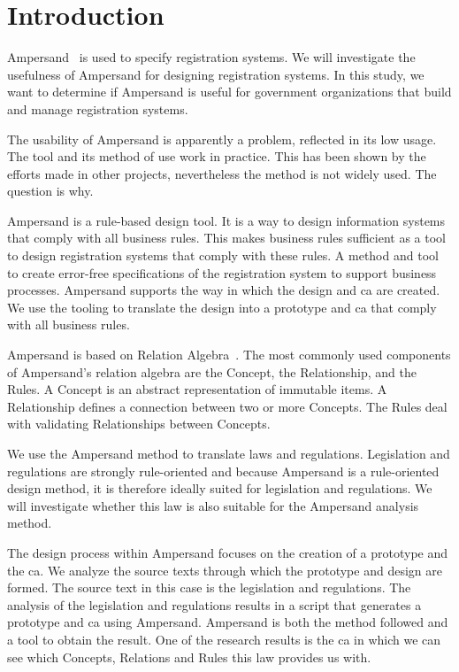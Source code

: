\newpage
\section{Introduction} \label{Introduction}
Ampersand~\citep{joosten_software_2017} is used to specify registration systems.
We will investigate the usefulness of Ampersand for designing registration systems.
In this study, we want to determine if Ampersand is useful for government organizations that build and manage registration systems.

The usability of Ampersand is apparently a problem, reflected in its low usage.
The tool and its method of use work in practice. 
This has been shown by the efforts made in other projects, nevertheless the method is not widely used.
The question is why.

Ampersand is a rule-based design tool.
It is a way to design information systems that comply with all business rules.
This makes business rules sufficient as a tool to design registration systems that comply with these rules.
A method and tool to create error-free specifications of the registration system to support business processes.
Ampersand supports the way in which the design and \acrlong{ca} are created.
We use the tooling to translate the design into a prototype and \acrshort{ca} that comply with all business rules.

Ampersand is based on Relation Algebra~\citep{maddux_bibliography_2006}.
The most commonly used components of Ampersand's relation algebra are the Concept, the Relationship, and the Rules.
A Concept is an abstract representation of immutable items.
A Relationship defines a connection between two or more Concepts.
The Rules deal with validating Relationships between Concepts.

We use the Ampersand method to translate laws and regulations.
Legislation and regulations are strongly rule-oriented and because Ampersand is a rule-oriented design method, it is therefore ideally suited for legislation and regulations.
We will investigate whether this law is also suitable for the Ampersand analysis method.

The design process within Ampersand focuses on the creation of a prototype and the \acrlong{ca}.
We analyze the source texts through which the prototype and design are formed.
The source text in this case is the legislation and regulations.
The analysis of the legislation and regulations results in a script that generates a prototype and \acrlong{ca} using Ampersand.
Ampersand is both the method followed and a tool to obtain the result.
One of the research results is the \acrlong{ca} in which we can see which Concepts, Relations and Rules this law provides us with.

